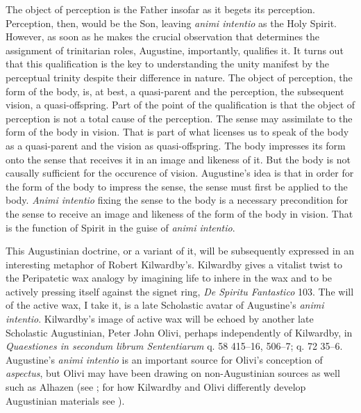 \documentclass[12pt]{article}
\begin{document}
The object of perception is the Father insofar as it begets its perception. Perception, then, would be the Son, leaving \emph{animi intentio} as the Holy Spirit. However, as soon as he makes the crucial observation that determines the assignment of trinitarian roles, Augustine, importantly, qualifies it. It turns out that this qualification is the key to understanding the unity manifest by the perceptual trinity despite their difference in nature. The object of perception, the form of the body, is, at best, a quasi-parent and the perception, the subsequent vision, a quasi-offspring. Part of the point of the qualification is that the object of perception is not a total cause of the perception. The sense may assimilate to the form of the body in vision. That is part of what licenses us to speak of the body as a quasi-parent and the vision as quasi-offspring. The body impresses its form onto the sense that receives it in an image and likeness of it. But the body is not causally sufficient for the occurence of vision. Augustine's idea is that in order for the form of the body to impress the sense, the sense must first be applied to the body. \emph{Animi intentio} fixing the sense to the body is a necessary precondition for the sense to receive an image and likeness of the form of the body in vision. That is the function of Spirit in the guise of \emph{animi intentio}. 

This Augustinian doctrine, or a variant of it, will be subsequently expressed in an interesting metaphor of Robert Kilwardby's. Kilwardby gives a vitalist twist to the Peripatetic wax analogy by imagining life to inhere in the wax and to be actively pressing itself against the signet ring, \emph{De Spiritu Fantastico} 103. The will of the active wax, I take it, is a late Scholastic avatar of Augustine's \emph{animi intentio}. Kilwardby's image of active wax will be echoed by another late Scholastic Augustinian, Peter John Olivi, perhaps independently of Kilwardby, in \emph{Quaestiones in secondum librum Sententiarum} q. 58 415–16, 506–7; q. 72 35–6. Augustine's \emph{animi intentio} is an important source for Olivi's conception of \emph{aspectus}, but Olivi may have been drawing on non-Augustinian sources as well such as Alhazen (see \citealt[41 especially n. 43]{Tachau:1988aa}; for how Kilwardby and Olivi differently develop Augustinian materials see \citealt{Silva:2010zh}). 
\end{document}
